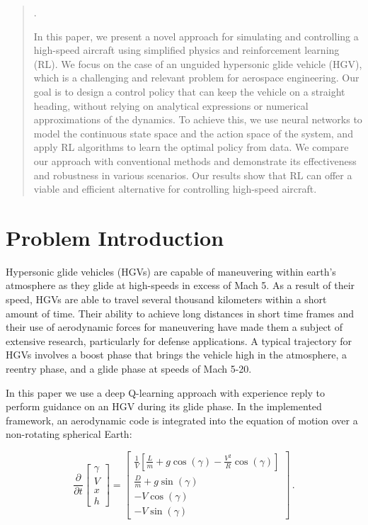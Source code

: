 \documentclass[11pt]{article} %
\begin{document}
\begin{abstract}. 
   
   In this paper, we present a novel approach for simulating and controlling a 
   high-speed aircraft using simplified physics and reinforcement learning (RL).
   We focus on the case of an unguided hypersonic glide vehicle (HGV), 
   which is a challenging and relevant problem for aerospace engineering.
   Our goal is to design a control policy that can keep the vehicle on a straight heading, 
   without relying on analytical expressions or numerical approximations of the dynamics. 
   To achieve this, we use neural networks to model the continuous state space 
   and the action space of the system, and apply RL algorithms to learn the optimal policy from data. 
   We compare our approach with conventional methods and demonstrate its effectiveness 
   and robustness in various scenarios. Our results show that RL can offer a 
   viable and efficient alternative for controlling high-speed aircraft.
\end{abstract}
   

\section{Problem Introduction}
Hypersonic glide vehicles (HGVs) are capable of maneuvering within earth's atmosphere as they glide at high-speeds
in excess of Mach 5. As a result of their speed, HGVs are able to travel several thousand kilometers within a short
amount of time. Their ability to achieve long distances in short time frames and their use of aerodynamic forces for
maneuvering have made them a subject of extensive research, particularly for defense applications.
A typical trajectory for HGVs involves a boost phase that brings the vehicle high in the atmosphere, a reentry phase,
and a glide phase at speeds of Mach 5-20. 

In this paper we use a deep Q-learning approach with experience reply to perform guidance on an HGV during its glide 
phase. In the implemented framework, an aerodynamic code is integrated into the equation of motion over a 
non-rotating spherical Earth:

\begin{equation}
   \frac{\partial}{\partial t}
   \begin{bmatrix}
       \gamma \\
       V \\
       x \\
       h 
   \end{bmatrix} =
   \begin{bmatrix}
       \frac{1}{V} \left[\frac{L}{m}+g \cos(\gamma)-\frac{V^2}{R} \cos(\gamma)\right] \\
       \frac{D}{m}+ g\sin(\gamma)\\
       -V\cos(\gamma) \\
       -V\sin(\gamma)
   \end{bmatrix} \, .
   \label{eqn:EOM}
\end{equation}
\end{document}
